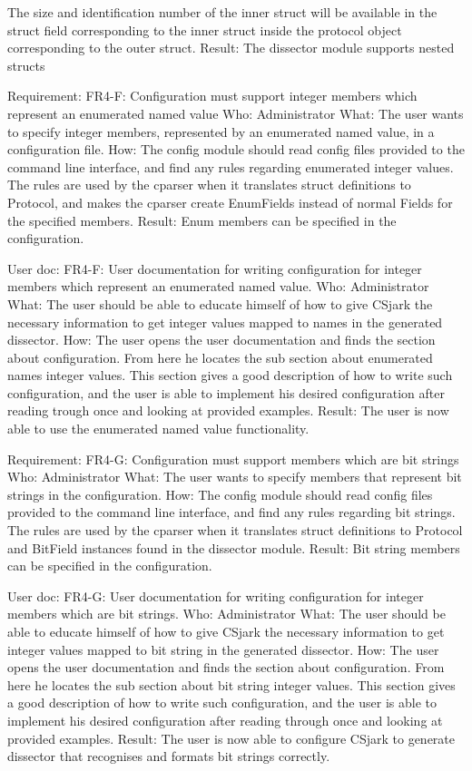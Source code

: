 The size and identification number of the inner struct will be available in the struct field corresponding to the inner struct inside the protocol object corresponding to the outer struct.
Result: The dissector module supports nested structs

Requirement: FR4-F: Configuration must support integer members which represent an enumerated named value
Who: Administrator
What: The user wants to specify integer members, represented by an enumerated named value, in a configuration file.
How: The config module should read config files provided to the command line interface, and find any rules regarding enumerated integer values. The rules are used by the cparser when it translates struct definitions to Protocol, and makes the cparser create EnumFields instead of normal Fields for the specified members.
Result: Enum members can be specified in the configuration.

User doc: FR4-F: User documentation for writing configuration for integer members which represent an enumerated named value.
Who: Administrator
What: The user should be able to educate himself of how to give CSjark the necessary information to get integer values mapped to names in the generated dissector.
How: The user opens the user documentation and finds the section about configuration. From here he locates the sub section about enumerated names integer values. This section gives a good description of how to write such configuration, and the user is able to implement his desired configuration after reading trough once and looking at provided examples.
Result: The user is now able to use the enumerated named value functionality.

Requirement: FR4-G: Configuration must support members which are bit strings
Who: Administrator
What: The user wants to specify members that represent bit strings in the configuration.
How: The config module should read config files provided to the command line interface, and find any rules regarding bit strings. The rules are used by the cparser when it translates struct definitions to Protocol and BitField instances found in the dissector module.
Result: Bit string members can be specified in the configuration.

User doc: FR4-G: User documentation for writing configuration for integer members which are bit strings.
Who: Administrator
What: The user should be able to educate himself of how to give CSjark the necessary information to get integer values mapped to bit string in the generated dissector.
How: The user opens the user documentation and finds the section about configuration. From here he locates the sub section about bit string integer values. This section gives a good description of how to write such configuration, and the user is able to implement his desired configuration after reading through once and looking at provided examples.
Result: The user is now able to configure CSjark to generate dissector that recognises and formats bit strings correctly.

